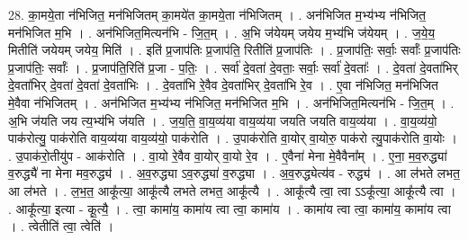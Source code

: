 \documentclass[17pt]{extarticle}
\begin{document}
28. का॒मये॒ता न॑भिजित॒ मन॑भिजितम् का॒मये॑त का॒मये॒ता न॑भिजितम् । . अन॑भिजित म॒भ्य॑भ्य न॑भिजित॒ मन॑भिजित म॒भि । . अन॑भिजित॒मित्यन॑भि - जि॒त॒म् । . अ॒भि ज॑येयम् जयेय म॒भ्य॑भि ज॑येयम् । . ज॒ये॒य॒ मितीति॑ जयेयम् जयेय॒ मिति॑ । . इति॑ प्र॒जाप॑तिः प्र॒जाप॑ति॒ रितीति॑ प्र॒जाप॑तिः । . प्र॒जाप॑तिः॒ सर्वाः॒ सर्वाः᳚ प्र॒जाप॑तिः प्र॒जाप॑तिः॒ सर्वाः᳚ । . प्र॒जाप॑ति॒रिति॑ प्र॒जा - प॒तिः॒ । . सर्वा॑ दे॒वता॑ दे॒वताः॒ सर्वाः॒ सर्वा॑ दे॒वताः᳚ । . दे॒वता॑ दे॒वता॑भिर् दे॒वता॑भिर् दे॒वता॑ दे॒वता॑ दे॒वता॑भिः । . दे॒वता॑भि रे॒वैव दे॒वता॑भिर् दे॒वता॑भि रे॒व । . ए॒वा न॑भिजित॒ मन॑भिजित मे॒वैवा न॑भिजितम् । . अन॑भिजित म॒भ्य॑भ्य न॑भिजित॒ मन॑भिजित म॒भि । . अन॑भिजित॒मित्यन॑भि - जि॒त॒म् । . अ॒भि ज॑यति जय त्य॒भ्य॑भि ज॑यति । . ज॒य॒ति॒ वा॒य॒व्य॑या वाय॒व्य॑या जयति जयति वाय॒व्य॑या । . वा॒य॒व्य॑यो॒ पाक॑रोत्यु॒ पाक॑रोति वाय॒व्य॑या वाय॒व्य॑यो॒ पाक॑रोति । . उ॒पाक॑रोति वा॒योर् वा॒योरु॒ पाक॑रो त्यु॒पाक॑रोति वा॒योः । . उ॒पाक॑रो॒तीयु॑प - आक॑रोति । . वा॒यो रे॒वैव वा॒योर् वा॒यो रे॒व । . ए॒वैना॑ मेना मे॒वैवैना᳚म् । . ए॒ना॒ म॒व॒रुद्ध्या॑ व॒रुद्ध्यै॑ ना मेना मव॒रुद्ध्य॑ । . अ॒व॒रुद्ध्या ऽव॒रुद्ध्या॑ व॒रुद्ध्या । . अ॒व॒रुद्ध्येत्य॑व - रुद्ध्य॑ । . आ ल॑भते लभत॒ आ ल॑भते । . ल॒भ॒त॒ आकू᳚त्या॒ आकू᳚त्यै लभते लभत॒ आकू᳚त्यै । . आकू᳚त्यै त्वा॒ त्वा ऽऽकू᳚त्या॒ आकू᳚त्यै त्वा । . आकू᳚त्या॒ इत्या - कू॒त्यै॒ । . त्वा॒ कामा॑य॒ कामा॑य त्वा त्वा॒ कामा॑य । . कामा॑य त्वा त्वा॒ कामा॑य॒ कामा॑य त्वा । . त्वेतीति॑ त्वा॒ त्वेति॑ । \newline
\end{document}
